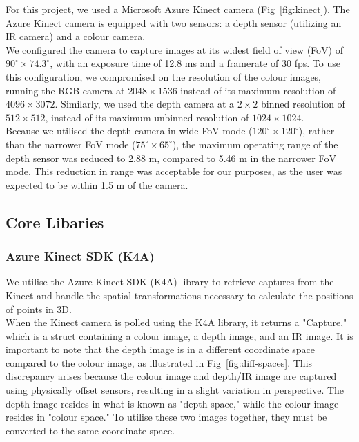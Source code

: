 For this project, we used a Microsoft Azure Kinect camera (Fig~\ref{fig:kinect}). The Azure Kinect camera is equipped with two sensors: a depth sensor (utilizing an IR camera) and a colour camera. \\

We configured the camera to capture images at its widest field of view (FoV) of $90^{\circ} \times 74.3^{\circ}$, with an exposure time of 12.8 ms and a framerate of 30 fps. To use this configuration, we compromised on the resolution of the colour images, running the RGB camera at $2048 \times 1536$ instead of its maximum resolution of $4096 \times 3072$. Similarly, we used the depth camera at a $2\times2$ binned resolution of $512 \times 512$, instead of its maximum unbinned resolution of $1024 \times 1024$. \\

Because we utilised the depth camera in wide FoV mode ($120^{\circ} \times 120^{\circ}$), rather than the narrower FoV mode ($75^{\circ} \times 65^{\circ}$), the maximum operating range of the depth sensor was reduced to 2.88 m, compared to 5.46 m in the narrower FoV mode. This reduction in range was acceptable for our purposes, as the user was expected to be within 1.5 m of the camera.


\subsection{Core Libaries}  

\subsubsection{Azure Kinect SDK (K4A)}

We utilise the Azure Kinect SDK (K4A) \cite{noauthor_microsoftazure-kinect-sensor-sdk_2024} library to retrieve captures from the Kinect and handle the spatial transformations necessary to calculate the positions of points in 3D. \\

When the Kinect camera is polled using the K4A library, it returns a "Capture," which is a struct containing a colour image, a depth image, and an IR image. It is important to note that the depth image is in a different coordinate space compared to the colour image, as illustrated in Fig~\ref{fig:diff-spaces}. This discrepancy arises because the colour image and depth/IR image are captured using physically offset sensors, resulting in a slight variation in perspective. The depth image resides in what is known as "depth space," while the colour image resides in "colour space." To utilise these two images together, they must be converted to the same coordinate space. \\

